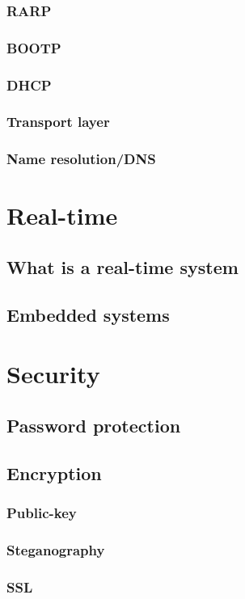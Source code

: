 \documentclass[a4paper,oneside]{report}
\begin{document}
    	\subsection{RARP}
    	\subsection{BOOTP}
    	\subsection{DHCP}
    	\subsection{Transport layer}
    	\subsection{Name resolution/DNS}
    	
    	
\chapter{Real-time}
  	\section{What is a real-time system}
  	\section{Embedded systems}
  	
  	
\chapter{Security}
  	\section{Password protection}
	\section{Encryption}
    	\subsection{Public-key}
    	\subsection{Steganography}
    	\subsection{SSL}
\end{document}
